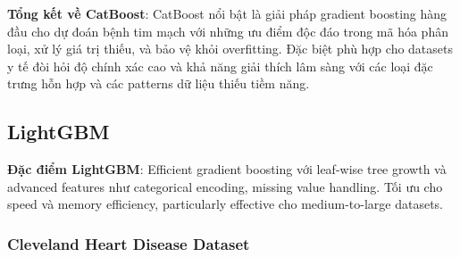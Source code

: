 \textbf{Tổng kết về CatBoost}: CatBoost nổi bật là giải pháp gradient boosting hàng đầu cho dự đoán bệnh tim mạch với những ưu điểm độc đáo trong mã hóa phân loại, xử lý giá trị thiếu, và bảo vệ khỏi overfitting. Đặc biệt phù hợp cho datasets y tế đòi hỏi độ chính xác cao và khả năng giải thích lâm sàng với các loại đặc trưng hỗn hợp và các patterns dữ liệu thiếu tiềm năng.

\FloatBarrier

\subsection{LightGBM}\label{subsec:lightgbm}

\textbf{Đặc điểm LightGBM}: Efficient gradient boosting với leaf-wise tree growth và advanced features như categorical encoding, missing value handling. Tối ưu cho speed và memory efficiency, particularly effective cho medium-to-large datasets.

\subsubsection{Cleveland Heart Disease Dataset}\label{subsubsec:lgbm-cleveland}


